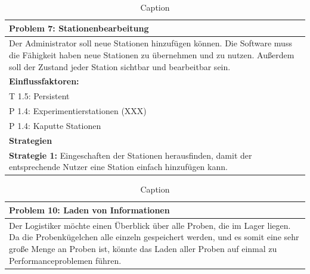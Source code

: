 \documentclass[enabledeprecatedfontcommands,fontsize=12pt,paper=a4,twoside]{scrartcl}
\begin{document}

\begin{table}[]
    \centering
    \begin{tabular}{|p{15cm}|}
    \hline
          \textbf{Problem 7:} Stationenbearbeitung
          \\ \hline
          Der Administrator soll neue Stationen hinzufügen können. Die Software muss die Fähigkeit haben neue Stationen zu übernehmen und zu nutzen. Außerdem soll der Zustand jeder Station sichtbar und bearbeitbar sein.
          \\ \hline
          \textbf{Einflussfaktoren: } \\
          T 1.5: Persistent \\
          P 1.4: Experimentierstationen (XXX)\\
          P 1.4: Kaputte Stationen\\
          \hline
          \textbf{Strategien} \\ \hline
          \textbf{Strategie 1:} Eingeschaften der Stationen herausfinden, damit der entsprechende Nutzer eine Station einfach hinzufügen kann.
          \\ \hline
    \end{tabular}
    \caption{Caption}
    \label{tab:my_label}
\end{table}


\begin{table}[]
    \centering
    \begin{tabular}{|p{15cm}|}
    \hline
          \textbf{Problem 10:} Laden von Informationen
          \\ \hline

          Der Logistiker möchte einen Überblick über alle Proben, die im Lager liegen. Da die Probenkügelchen alle einzeln gespeichert werden, und es somit eine sehr große Menge an Proben ist, könnte das Laden aller Proben auf einmal zu Performanceproblemen führen.

    \end{tabular}
    \caption{Caption}
    \label{tab:my_label}
\end{table}
\end{document}
